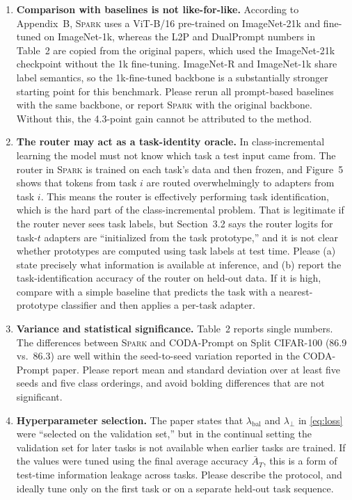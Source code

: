 \documentclass[11pt]{article}
\newcommand{\paper}{\textsc{Spark}}
\begin{document}
\begin{enumerate}[label=\textbf{M\arabic*.}]

  \item \textbf{Comparison with baselines is not like-for-like.} According to Appendix~B, \paper{} uses a ViT-B/16 pre-trained on ImageNet-21k and fine-tuned on ImageNet-1k, whereas the L2P and DualPrompt \citep{wang2022dualprompt} numbers in Table~2 are copied from the original papers, which used the ImageNet-21k checkpoint without the 1k fine-tuning. ImageNet-R and ImageNet-1k share label semantics, so the 1k-fine-tuned backbone is a substantially stronger starting point for this benchmark. Please rerun all prompt-based baselines with the same backbone, or report \paper{} with the original backbone. Without this, the 4.3-point gain cannot be attributed to the method.

  \item \textbf{The router may act as a task-identity oracle.} In class-incremental learning the model must not know which task a test input came from. The router in \paper{} is trained on each task's data and then frozen, and Figure~5 shows that tokens from task $i$ are routed overwhelmingly to adapters from task $i$. This means the router is effectively performing task identification, which is the hard part of the class-incremental problem. That is legitimate if the router never sees task labels, but Section~3.2 says the router logits for task-$t$ adapters are ``initialized from the task prototype,'' and it is not clear whether prototypes are computed using task labels at test time. Please (a) state precisely what information is available at inference, and (b) report the task-identification accuracy of the router on held-out data. If it is high, compare with a simple baseline that predicts the task with a nearest-prototype classifier and then applies a per-task adapter.

  \item \textbf{Variance and statistical significance.} Table~2 reports single numbers. The differences between \paper{} and CODA-Prompt on Split CIFAR-100 (86.9 vs.\ 86.3) are well within the seed-to-seed variation reported in the CODA-Prompt paper. Please report mean and standard deviation over at least five seeds and five class orderings, and avoid bolding differences that are not significant.

  \item \textbf{Hyperparameter selection.} The paper states that $\lambda_\text{bal}$ and $\lambda_\perp$ in \eqref{eq:loss} were ``selected on the validation set,'' but in the continual setting the validation set for later tasks is not available when earlier tasks are trained. If the values were tuned using the final average accuracy $\bar{A}_T$, this is a form of test-time information leakage across tasks. Please describe the protocol, and ideally tune only on the first task or on a separate held-out task sequence.


\end{enumerate}
\end{document}
